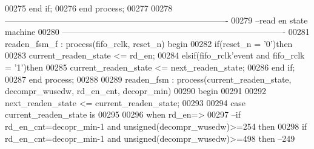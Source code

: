 \begin{DoxyCode}
00275     \textcolor{keywordflow}{end} \textcolor{keywordflow}{if}; 
00276 \textcolor{keywordflow}{end} \textcolor{keywordflow}{process};
00277 
00278 \textcolor{keyword}{-------------------------------------------------------------------------------}
00279 \textcolor{keyword}{--read en state machine}
00280 \textcolor{keyword}{-------------------------------------------------------------------------------}
00281 readen\_fsm\_f : \textcolor{keywordflow}{process}(fifo_rclk, reset_n) \textcolor{keywordflow}{begin}
00282     \textcolor{keywordflow}{if}\textcolor{vhdlchar}{(}\textcolor{vhdlchar}{reset_n} \textcolor{vhdlchar}{=} \textcolor{vhdlchar}{'}\textcolor{vhdllogic}{}\textcolor{vhdllogic}{0}\textcolor{vhdlchar}{'}\textcolor{vhdlchar}{)}\textcolor{keywordflow}{then}
00283         \textcolor{vhdlchar}{current_readen_state} \textcolor{vhdlchar}{<=} \textcolor{vhdlchar}{rd\_en};
00284     \textcolor{keywordflow}{elsif}\textcolor{vhdlchar}{(}\textcolor{vhdlchar}{fifo_rclk}\textcolor{vhdlchar}{'}\textcolor{vhdlkeyword}{event} \textcolor{keywordflow}{and} \textcolor{vhdlchar}{fifo_rclk} \textcolor{vhdlchar}{=} \textcolor{vhdlchar}{'}\textcolor{vhdllogic}{}\textcolor{vhdllogic}{1}\textcolor{vhdlchar}{'}\textcolor{vhdlchar}{)}\textcolor{keywordflow}{then} 
00285         \textcolor{vhdlchar}{current_readen_state} \textcolor{vhdlchar}{<=} \textcolor{vhdlchar}{next_readen_state};
00286     \textcolor{keywordflow}{end} \textcolor{keywordflow}{if}; 
00287 \textcolor{keywordflow}{end} \textcolor{keywordflow}{process};
00288 
00289 readen\_fsm : \textcolor{keywordflow}{process}(current_readen_state, decompr_wusedw, rd_en_cnt, decopr_min)
00290 \textcolor{vhdlkeyword}{begin}
00291   
00292     \textcolor{vhdlchar}{next_readen_state} \textcolor{vhdlchar}{<=} \textcolor{vhdlchar}{current_readen_state};
00293     
00294     \textcolor{keywordflow}{case} \textcolor{vhdlchar}{current_readen_state} \textcolor{keywordflow}{is}
00295 
00296       \textcolor{keywordflow}{when} \textcolor{vhdlchar}{rd\_en}\textcolor{vhdlchar}{=}\textcolor{vhdlchar}{>}
00297 \textcolor{keyword}{        --if rd\_en\_cnt=decopr\_min-1 and unsigned(decompr\_wusedw)>=254 then}
00298         \textcolor{keywordflow}{if} \textcolor{vhdlchar}{rd_en_cnt}\textcolor{vhdlchar}{=}\textcolor{vhdlchar}{decopr_min}\textcolor{vhdlchar}{-}\textcolor{vhdllogic}{}\textcolor{vhdllogic}{1} \textcolor{keywordflow}{and} \textcolor{comment}{unsigned}\textcolor{vhdlchar}{(}\textcolor{vhdlchar}{decompr_wusedw}\textcolor{vhdlchar}{)}\textcolor{vhdlchar}{>=}\textcolor{vhdllogic}{}\textcolor{vhdllogic}{498} \textcolor{keywordflow}{then}\textcolor{keyword}{ --249 }

\end{DoxyCode}
